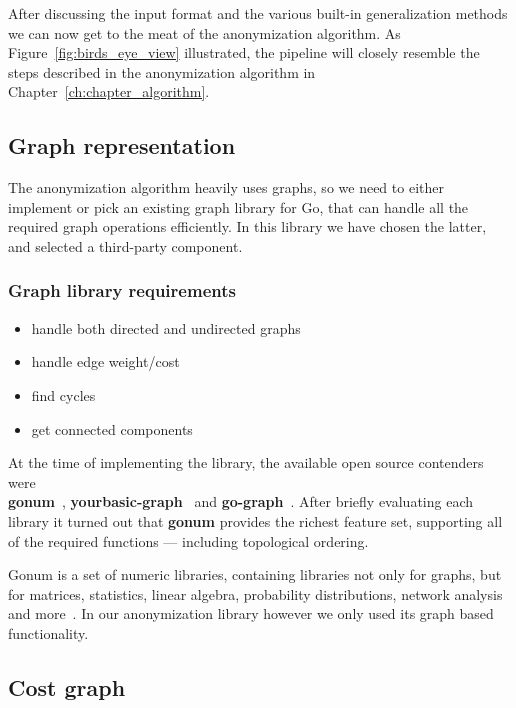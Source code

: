 After discussing the input format and the various built-in generalization methods we can now get to the meat of the anonymization algorithm.
As Figure~\ref{fig:birds_eye_view} illustrated, the pipeline will closely resemble the steps described in the anonymization algorithm in Chapter~\ref{ch:chapter_algorithm}.

\subsection{Graph representation}

The anonymization algorithm heavily uses graphs, so we need to either implement or pick an existing graph library for Go, that can handle all the required graph operations efficiently. In this library we have chosen the latter, and selected a third-party component.

\subsubsection{Graph library requirements}

\begin{itemize}
    \item handle both directed and undirected graphs
    \item handle edge weight/cost
    \item find cycles
    \item get connected components
\end{itemize}

At the time of implementing the library, the available open source contenders were \\
\textbf{gonum}~\cite{gonum}, \textbf{yourbasic-graph}~\cite{yourbasic-graph} and \textbf{go-graph}~\cite{StepLg/go-graph}.
After briefly evaluating each library it turned out that \textbf{gonum} provides the richest feature set, supporting all of the required functions --- including topological ordering.

Gonum is a set of numeric libraries, containing libraries not only for graphs, but for matrices, statistics, linear algebra, probability distributions, network analysis and more~\cite{gonum-webpage}. In our anonymization library however we only used its graph based functionality.

\subsection{Cost graph}\label{subsec:cost_graph_algorithm}

